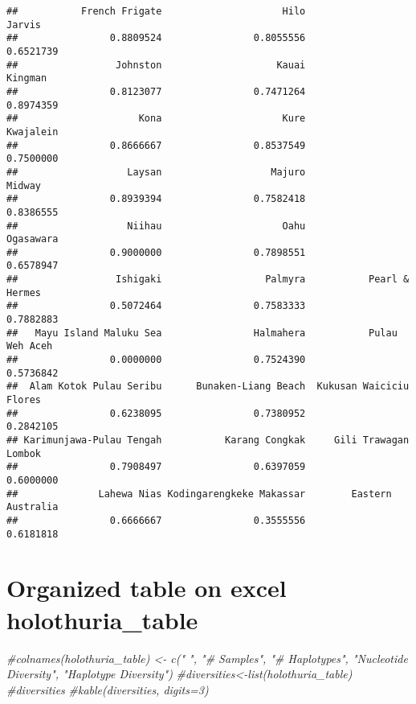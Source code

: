 \documentclass[
]{article}
\newenvironment{Shaded}{\begin{snugshade}}{\end{snugshade}}
\newcommand{\CommentTok}[1]{\textcolor[rgb]{0.56,0.35,0.01}{\textit{#1}}}
\begin{document}
\begin{verbatim}
##           French Frigate                     Hilo                   Jarvis 
##                0.8809524                0.8055556                0.6521739 
##                 Johnston                    Kauai                  Kingman 
##                0.8123077                0.7471264                0.8974359 
##                     Kona                     Kure                Kwajalein 
##                0.8666667                0.8537549                0.7500000 
##                   Laysan                   Majuro                   Midway 
##                0.8939394                0.7582418                0.8386555 
##                   Niihau                     Oahu                Ogasawara 
##                0.9000000                0.7898551                0.6578947 
##                 Ishigaki                  Palmyra           Pearl & Hermes 
##                0.5072464                0.7583333                0.7882883 
##   Mayu Island Maluku Sea                Halmahera           Pulau Weh Aceh 
##                0.0000000                0.7524390                0.5736842 
##  Alam Kotok Pulau Seribu      Bunaken-Liang Beach  Kukusan Waiciciu Flores 
##                0.6238095                0.7380952                0.2842105 
## Karimunjawa-Pulau Tengah           Karang Congkak     Gili Trawagan Lombok 
##                0.7908497                0.6397059                0.6000000 
##              Lahewa Nias Kodingarengkeke Makassar        Eastern Australia 
##                0.6666667                0.3555556                0.6181818
\end{verbatim}

\hypertarget{organized-table-on-excel-holothuria_table}{%
\section{Organized table on excel
holothuria\_table}\label{organized-table-on-excel-holothuria_table}}

\begin{Shaded}
\begin{Highlighting}[]
\CommentTok{#colnames(holothuria_table) <- c(" ", "# Samples", "# Haplotypes", "Nucleotide Diversity", "Haplotype Diversity")}
\CommentTok{#diversities<-list(holothuria_table)}
\CommentTok{#diversities}
\CommentTok{#kable(diversities, digits=3)}
\end{Highlighting}
\end{Shaded}
\end{document}
